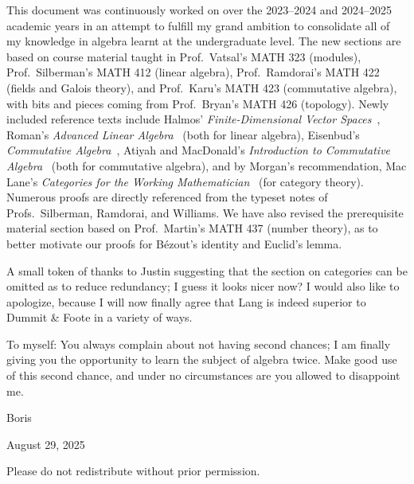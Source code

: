 This document was continuously worked on
over the 2023--2024 and 2024--2025 academic years
in an attempt to fulfill my grand ambition
to consolidate all of my knowledge in algebra
learnt at the undergraduate level.
The new sections are based on course material taught in
Prof.\ Vatsal's MATH 323 (modules),
Prof.\ Silberman's MATH 412 (linear algebra),
Prof.\ Ramdorai's MATH 422 (fields and Galois theory),
and Prof.\ Karu's MATH 423 (commutative algebra),
with bits and pieces coming from Prof.\ Bryan's MATH 426 (topology).
Newly included reference texts include
Halmos' \textit{Finite-Dimensional Vector Spaces}~\cite{halmos},
Roman's \textit{Advanced Linear Algebra}~\cite{roman} (both for linear algebra),
Eisenbud's \textit{Commutative Algebra}~\cite{eisenbud},
Atiyah and MacDonald's \textit{Introduction to Commutative Algebra}~\cite{atiyahmacdonald} (both for commutative algebra),
and by Morgan's recommendation,
Mac Lane's \textit{Categories for the Working Mathematician}~\cite{maclane} (for category theory).
Numerous proofs are directly referenced from the typeset notes of
Profs.\ Silberman, Ramdorai, and Williams.
We have also revised the prerequisite material section based on Prof.\ Martin's MATH 437 (number theory),
as to better motivate our proofs for B\'ezout's identity and Euclid's lemma.

A small token of thanks to Justin
suggesting that the section on categories can be omitted
as to reduce redundancy;
I guess it looks nicer now?
I would also like to apologize,
because I will now finally agree that Lang is indeed
superior to Dummit \& Foote in a variety of ways.

\medskip

To myself:
You always complain about not having second chances;
I am finally giving you the opportunity to learn the subject of algebra twice.
Make good use of this second chance,
and under no circumstances are you allowed to disappoint me.

\medskip

Boris

August 29, 2025

\vspace{5mm}

Please do not redistribute without prior permission.
